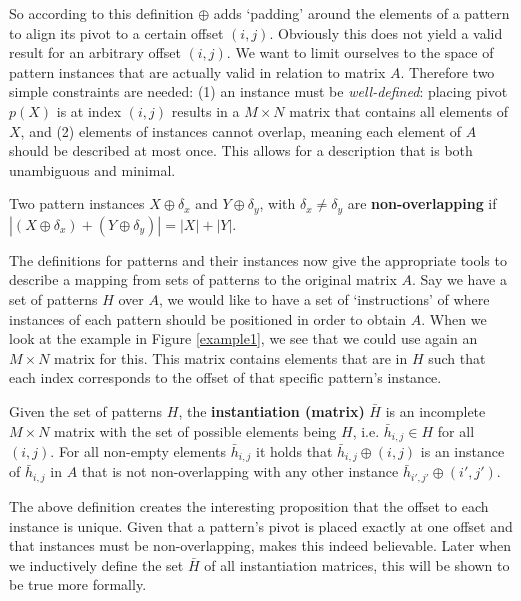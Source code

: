 \documentclass{llncs}
\begin{document}
So according to this definition $\oplus$ adds `padding' around the elements of a pattern to align its pivot to a certain offset $(i,j)$. Obviously this does not yield a valid result for an arbitrary offset $(i,j)$. We want to limit ourselves to the space of pattern instances that are actually valid in relation to matrix $A$. Therefore two simple constraints are needed: (1) an instance must be \emph{well-defined}: placing pivot $p(X)$ is at index $(i,j)$ results in a $M\times N$ matrix that contains all elements of $X$, and (2) elements of instances cannot overlap, meaning each element of $A$ should be described at most once. This allows for a description that is both unambiguous and minimal.

\begin{definition}
Two pattern instances $X \oplus \delta_x$ and $Y \oplus \delta_y$, with $\delta_x \neq \delta_y$ are \textbf{non-overlapping} if $|(X \oplus \delta_x) + (Y \oplus \delta_y)| = |X|+|Y|$.
\end{definition}

The definitions for patterns and their instances now give the appropriate tools to describe a mapping from sets of patterns to the original matrix $A$. Say we have a set of patterns $H$ over $A$, we would like to have a set of `instructions' of where instances of each pattern should be positioned in order to obtain $A$. When we look at the example in Figure \ref{example1}, we see that we could use again an $M\times N$ matrix for this. This matrix contains elements that are in $H$ such that each index corresponds to the offset of that specific pattern's instance.

\begin{definition}
Given the set of patterns $H$, the \textbf{instantiation (matrix)} $\bar{H}$ is an incomplete $M\times N$ matrix with the set of possible elements being $H$, i.e. $\bar{h}_{i,j} \in H$ for all $(i,j)$. For all non-empty elements $\bar{h}_{i,j}$ it holds that $\bar{h}_{i,j} \oplus (i,j)$ is an instance of $\bar{h}_{i,j}$ in $A$ that is not non-overlapping with any other instance $\bar{h}_{i',j'} \oplus (i',j')$.
\end{definition}

The above definition creates the interesting proposition that the offset to each instance is unique. Given that a pattern's pivot is placed exactly at one offset and that instances must be non-overlapping, makes this indeed believable. Later when we inductively define the set $\bar{H}$ of all instantiation matrices, this will be shown to be true more formally. 
\end{document}
